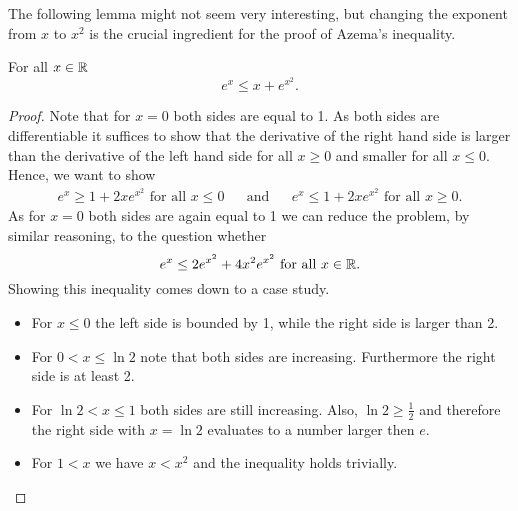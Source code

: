 
The following lemma might not seem very interesting, but changing the exponent from $x$ to $x^2$ is the crucial ingredient for the proof of Azema's inequality.
\begin{lemma}\label{lem:exToex2} For all $x\in\mathbb{R}$
\[e^{x}\leq x+e^{x^2}.\]
\end{lemma} 
\begin{proof}
Note that for $x=0$ both sides are equal to 1. As both sides are differentiable it suffices to show that the derivative of the right hand side is larger than the derivative of the left hand side for all $x\geq0$ and smaller for all $x\leq0$. Hence, we want to show
\begin{align*}
e^x\geq 1+2xe^{x^2}\text{ for all $x\leq 0$} &&\text{and}&& e^x\leq 1+2xe^{x^2}\text{ for all $x\geq 0$}.
\end{align*}
As for $x=0$ both sides are again equal to 1 we can reduce the problem, by similar reasoning, to the question whether
\[e^x\leq 2e^{x^2}+4x^2e^{x^2}\text{ for all $x\in\mathbb{R}$}.\]
Showing this inequality comes down to a case study.
\begin{itemize}
\item For $x\leq0$ the left side is bounded by 1, while the right side is larger than 2.
\item For $0<x\leq\ln 2$ note that both sides are increasing. Furthermore the right side is at least 2.
\item For $\ln2<x\leq1$ both sides are still increasing. Also, $\ln2\geq\frac{1}{2}$ and therefore the right side with $x=\ln2$ evaluates to a number larger then $e$.  
\item For $1< x$ we have $x< x^2$ and the inequality holds trivially.
\end{itemize}
\end{proof}

